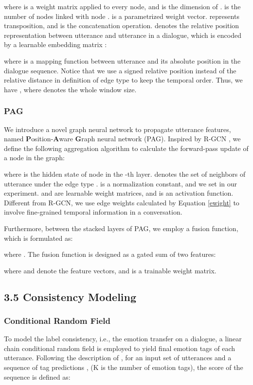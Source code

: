 \documentclass[letterpaper]{article} \usepackage{aaai22}  \usepackage{times}  \usepackage{helvet}  \usepackage{courier}  \usepackage[hyphens]{url}  \usepackage{graphicx} \urlstyle{rm} \def\UrlFont{\rm}  \usepackage{natbib}  \usepackage{caption} \DeclareCaptionStyle{ruled}{labelfont=normalfont,labelsep=colon,strut=off} \frenchspacing  \setlength{\pdfpagewidth}{8.5in}  \setlength{\pdfpageheight}{11in}  \usepackage{algorithm}
\begin{document}
 




where  is a weight matrix applied to every node, and  is the dimension of .   
 is the number of nodes linked with node .
 is a parametrized weight vector.  represents transposition, and  is the concatenation operation.  denotes the relative position representation between utterance  and utterance  in a dialogue, which is encoded by a learnable embedding matrix :

 


where  is a mapping function between utterance and its absolute position in the dialogue sequence. Notice that we use a signed relative position instead of the relative distance in definition of edge type to keep the temporal order. Thus, we have , where  denotes the whole window size.


\subsubsection{PAG} 
We introduce a novel graph neural network to propagate utterance features, named \textbf{P}osition-\textbf{A}ware \textbf{G}raph neural network (PAG). 
Inspired by R-GCN \cite{rgcn}, we define the following aggregation algorithm to calculate the forward-pass update of a node in the graph:

where  is the hidden state of node  in the -th layer.  denotes the set of neighbors of utterance  under the edge type .  is a normalization constant, and we set  in our experiment.  and  are learnable weight matrices, and  is an activation function. Different from R-GCN, we use edge weights calculated by Equation \ref{ewight} to involve fine-grained temporal information in a conversation.


Furthermore, between the stacked layers of PAG, we employ a fusion function, which is formulated as:




where . The fusion function is designed as a gated sum of two features:



where  and  denote the feature vectors, and  is a trainable weight matrix. 

\subsection{3.5 Consistency Modeling}

\subsubsection{Conditional Random Field}
To model the label consistency, i.e., the emotion transfer on a dialogue, a linear chain conditional random field is employed to yield final emotion tags of each utterance. Following the description of \cite{lample}, for an input set of utterances  and a sequence of tag predictions ,  (K is the number of emotion tags), the score of the sequence is defined as:
\end{document}
